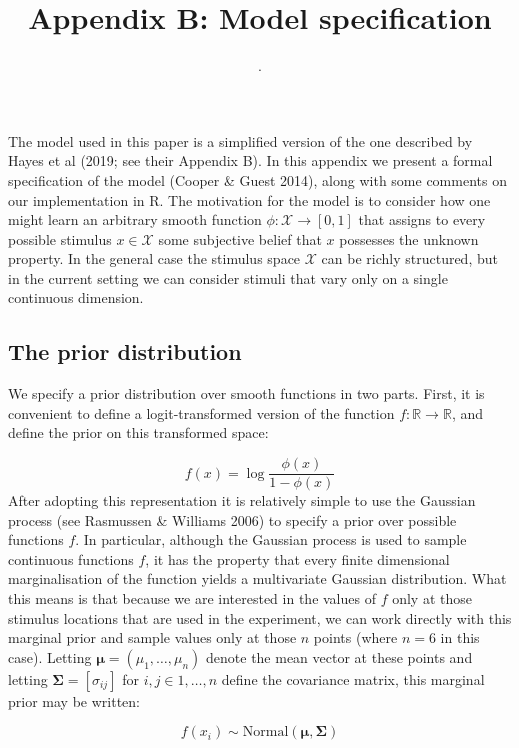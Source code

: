 \documentclass[
  english,
  doc]{apa6}
\author{.}
\affiliation{\phantom{a}}
\title{Appendix B: Model specification}
\date{}
\begin{document}
\maketitle

\noindent
The model used in this paper is a simplified version of the one described by Hayes et al (2019; see their Appendix B). In this appendix we present a formal specification of the model (Cooper \& Guest 2014), along with some comments on our implementation in R. The motivation for the model is to consider how one might learn an arbitrary smooth function \(\phi : \mathcal{X} \rightarrow [0, 1]\) that assigns to every possible stimulus \(x \in \mathcal{X}\) some subjective belief that \(x\) possesses the unknown property. In the general case the stimulus space \(\mathcal{X}\) can be richly structured, but in the current setting we can consider stimuli that vary only on a single continuous dimension.

\hypertarget{the-prior-distribution}{%
\subsection{The prior distribution}\label{the-prior-distribution}}

\noindent
We specify a prior distribution over smooth functions in two parts. First, it is convenient to define a logit-transformed version of the function \(f : \mathbb{R} \rightarrow \mathbb{R}\), and define the prior on this transformed space:

\[
f(x) = \log \frac{\phi(x)}{1 - \phi(x)}
\]
After adopting this representation it is relatively simple to use the Gaussian process (see Rasmussen \& Williams 2006) to specify a prior over possible functions \(f\). In particular, although the Gaussian process is used to sample continuous functions \(f\), it has the property that every finite dimensional marginalisation of the function yields a multivariate Gaussian distribution. What this means is that because we are interested in the values of \(f\) only at those stimulus locations that are used in the experiment, we can work directly with this marginal prior and sample values only at those \(n\) points (where \(n = 6\) in this case). Letting \(\bm{\mu} = (\mu_1, \ldots, \mu_n)\) denote the mean vector at these points and letting \(\bm{\Sigma} = [\sigma_{ij}]\) for \(i, j \in 1, \ldots, n\) define the covariance matrix, this marginal prior may be written:

\[
f(x_i) \sim \mbox{Normal}(\bm\mu, \bm\Sigma)
\]
\end{document}
